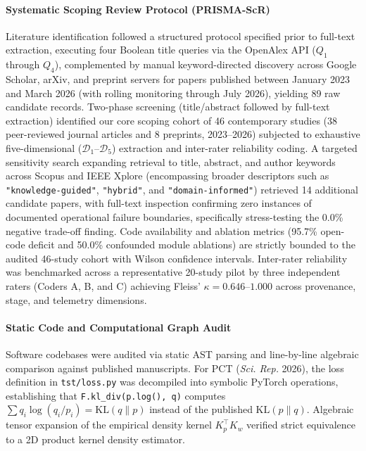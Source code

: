 \paragraph*{Systematic Scoping Review Protocol (PRISMA-ScR)}
Literature identification followed a structured protocol specified prior to full-text extraction, executing four Boolean title queries via the OpenAlex API ($Q_1$ through $Q_4$), complemented by manual keyword-directed discovery across Google Scholar, arXiv, and preprint servers for papers published between January 2023 and March 2026 (with rolling monitoring through July 2026), yielding 89 raw candidate records. Two-phase screening (title/abstract followed by full-text extraction) identified our core scoping cohort of 46 contemporary studies (38 peer-reviewed journal articles and 8 preprints, 2023--2026) subjected to exhaustive five-dimensional ($\mathcal{D}_1$--$\mathcal{D}_5$) extraction and inter-rater reliability coding. A targeted sensitivity search expanding retrieval to title, abstract, and author keywords across Scopus and IEEE Xplore (encompassing broader descriptors such as \texttt{"knowledge-guided"}, \texttt{"hybrid"}, and \texttt{"domain-informed"}) retrieved 14 additional candidate papers, with full-text inspection confirming zero instances of documented operational failure boundaries, specifically stress-testing the 0.0\% negative trade-off finding. Code availability and ablation metrics (95.7\% open-code deficit and 50.0\% confounded module ablations) are strictly bounded to the audited 46-study cohort with Wilson confidence intervals. Inter-rater reliability was benchmarked across a representative 20-study pilot by three independent raters (Coders A, B, and C) achieving Fleiss' $\kappa = 0.646\text{--}1.000$ across provenance, stage, and telemetry dimensions.

\paragraph*{Static Code and Computational Graph Audit}
Software codebases were audited via static AST parsing and line-by-line algebraic comparison against published manuscripts. For PCT (\textit{Sci. Rep.} 2026), the loss definition in \texttt{tst/loss.py} was decompiled into symbolic PyTorch operations, establishing that \texttt{F.kl\_div(p.log(), q)} computes $\sum q_i \log(q_i / p_i) = \text{KL}(q \parallel p)$ instead of the published $\text{KL}(p \parallel q)$. Algebraic tensor expansion of the empirical density kernel $K_p^\top K_w$ verified strict equivalence to a 2D product kernel density estimator.


